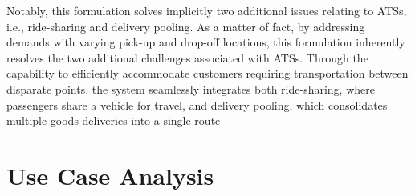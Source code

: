 Notably, this formulation solves implicitly two additional issues relating to ATSs, i.e., ride-sharing and delivery pooling. As a matter of fact, by addressing demands with varying pick-up and drop-off locations, this formulation inherently resolves the two additional challenges associated with ATSs. Through the capability to efficiently accommodate customers requiring transportation between disparate points, the system seamlessly integrates both ride-sharing, where passengers share a vehicle for travel, and delivery pooling, which consolidates multiple goods deliveries into a single route



\section{Use Case Analysis}\label{sec:use_case_analysis_ats}
